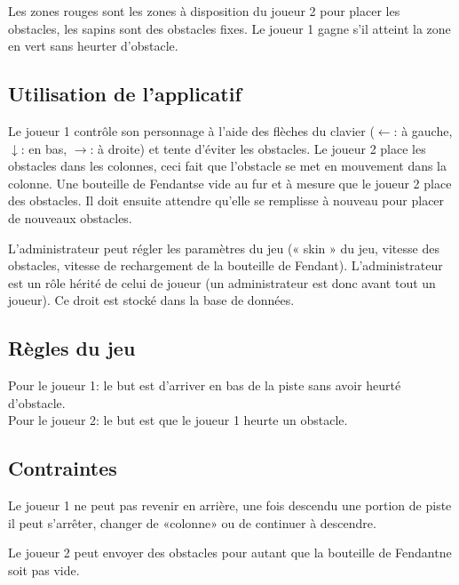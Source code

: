 \documentclass[a4paper,12pt]{article}
\begin{document}
	Les zones rouges sont les zones à disposition du joueur 2 pour placer les obstacles, les sapins sont des obstacles fixes. Le joueur 1 gagne s'il atteint la zone en vert sans heurter d'obstacle.
	
	
	\subsection{Utilisation de l'applicatif}
	Le joueur 1 contrôle son personnage à l'aide des flèches du clavier ($\leftarrow$: à gauche, $\downarrow $: en bas, $\rightarrow$: à droite) et tente d'éviter les obstacles. Le joueur 2 place les obstacles dans les colonnes, ceci fait que l'obstacle se met en mouvement dans la colonne. Une bouteille de Fendant\texttrademark se vide au fur et à mesure que le joueur 2 place des obstacles. Il doit ensuite attendre qu'elle se remplisse à nouveau pour placer de nouveaux obstacles.\par
	
	L'administrateur peut régler les paramètres du jeu (« skin » du jeu, vitesse des obstacles, vitesse de rechargement de la bouteille de Fendant\texttrademark). L'administrateur est un rôle hérité de celui de joueur (un administrateur est donc avant tout un joueur). Ce droit est stocké dans la base de données.
	
	
	\subsection{Règles du jeu}
	Pour le joueur 1: le but est d'arriver en bas de la piste sans avoir heurté d'obstacle. \\
	Pour le joueur 2: le but est que le joueur 1 heurte un obstacle.
	
	
	\subsection{Contraintes}
	Le joueur 1 ne peut pas revenir en arrière, une fois descendu une portion de piste il peut s'arrêter, changer de «colonne» ou de continuer à descendre. \par
	
	Le joueur 2 peut envoyer des obstacles pour autant que la bouteille de Fendant\texttrademark ne soit pas vide.
	
	
\end{document}
